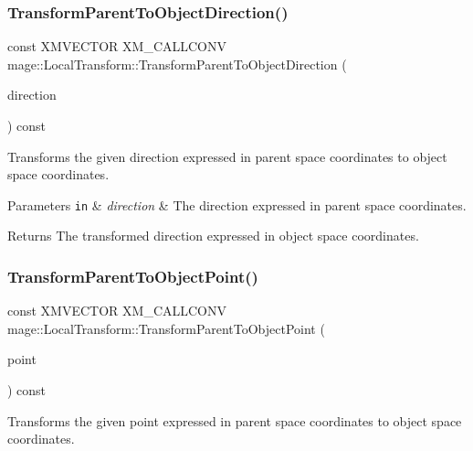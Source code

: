 \subsubsection{\texorpdfstring{Transform\+Parent\+To\+Object\+Direction()}{TransformParentToObjectDirection()}}
{\footnotesize\ttfamily const X\+M\+V\+E\+C\+T\+OR X\+M\+\_\+\+C\+A\+L\+L\+C\+O\+NV mage\+::\+Local\+Transform\+::\+Transform\+Parent\+To\+Object\+Direction (\begin{DoxyParamCaption}\item[{F\+X\+M\+V\+E\+C\+T\+OR}]{direction }\end{DoxyParamCaption}) const\hspace{0.3cm}{\ttfamily [noexcept]}}

Transforms the given direction expressed in parent space coordinates to object space coordinates.


\begin{DoxyParams}[1]{Parameters}
\mbox{\tt in}  & {\em direction} & The direction expressed in parent space coordinates. \\
\hline
\end{DoxyParams}
\begin{DoxyReturn}{Returns}
The transformed direction expressed in object space coordinates. 
\end{DoxyReturn}
\mbox{\label{classmage_1_1_local_transform_a869e0acb9947f74405bad09164182373}} 
\subsubsection{\texorpdfstring{Transform\+Parent\+To\+Object\+Point()}{TransformParentToObjectPoint()}}
{\footnotesize\ttfamily const X\+M\+V\+E\+C\+T\+OR X\+M\+\_\+\+C\+A\+L\+L\+C\+O\+NV mage\+::\+Local\+Transform\+::\+Transform\+Parent\+To\+Object\+Point (\begin{DoxyParamCaption}\item[{F\+X\+M\+V\+E\+C\+T\+OR}]{point }\end{DoxyParamCaption}) const\hspace{0.3cm}{\ttfamily [noexcept]}}

Transforms the given point expressed in parent space coordinates to object space coordinates.


